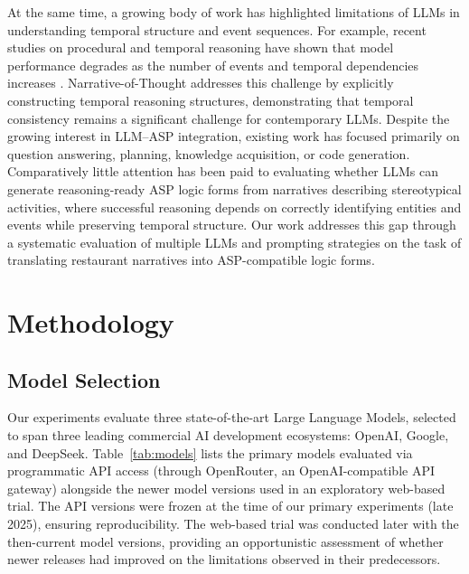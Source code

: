 \documentclass[runningheads]{llncs}
\begin{document}
At the same time, a growing body of work has highlighted limitations of LLMs in understanding temporal structure and event sequences. For example, recent studies on procedural and temporal reasoning have shown that model performance degrades as the number of events and temporal dependencies increases \cite{wg25,am25}. Narrative-of-Thought \cite{Wang2024NarrativeOfThought} addresses this challenge by explicitly constructing temporal reasoning structures, demonstrating that temporal consistency remains a significant challenge for contemporary LLMs. Despite the growing interest in LLM--ASP integration, existing work has focused primarily on question answering, planning, knowledge acquisition, or code generation. Comparatively little attention has been paid to evaluating whether LLMs can generate reasoning-ready ASP logic forms from narratives describing stereotypical activities, where successful reasoning depends on correctly identifying entities and events while preserving temporal structure. Our work addresses this gap through a systematic evaluation of multiple LLMs and prompting strategies on the task of translating restaurant narratives into ASP-compatible logic forms.




\section{Methodology}
\label{sec:methodology}

\subsection{Model Selection}
\label{sec:model-selection}

Our experiments evaluate three state-of-the-art Large Language Models, selected to
span three leading commercial AI development ecosystems: OpenAI, Google, and
DeepSeek.  Table~\ref{tab:models} lists the primary models evaluated via
programmatic API access (through OpenRouter, an OpenAI-compatible API gateway)
alongside the newer model versions used in an exploratory web-based trial.
The API versions were frozen at the time of our primary experiments
(late 2025), ensuring reproducibility.  The web-based trial was conducted later
with the then-current model versions, providing an opportunistic assessment of
whether newer releases had improved on the limitations observed in their
predecessors.
\end{document}
